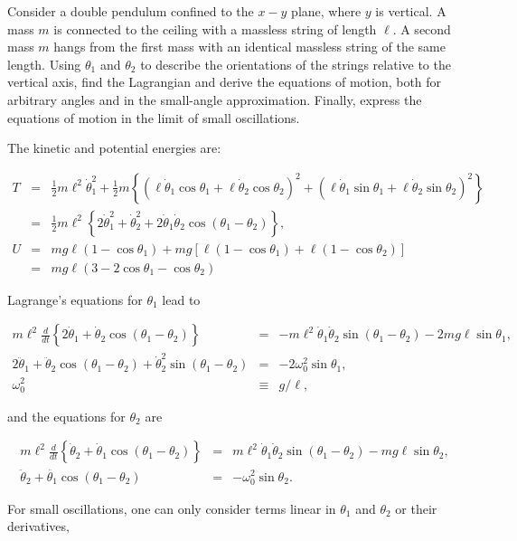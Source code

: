 \documentclass[%
oneside,                 %
final,                   %
10pt]{article}
\begin{document}
Consider a double pendulum confined to the $x-y$ plane, where $y$ is
vertical. A mass $m$ is connected to the ceiling with a massless
string of length $\ell$. A second mass $m$ hangs from the first mass
with an identical massless string of the same length. Using $\theta_1$
and $\theta_2$ to describe the orientations of the strings relative to
the vertical axis, find the Lagrangian and derive the equations of
motion, both for arbitrary angles and in the small-angle
approximation. Finally, express the equations of motion in the limit
of small oscillations.

The kinetic and potential energies are:

\begin{eqnarray*}
T&=&\frac{1}{2}m\ell^2\dot{\theta}_1^2
+\frac{1}{2}m\left\{(\ell\dot{\theta}_1\cos\theta_1+\ell\dot{\theta}_2\cos\theta_2)^2
+(\ell\dot{\theta}_1\sin\theta_1+\ell\dot{\theta}_2\sin\theta_2)^2\right\}\\
&=&\frac{1}{2}m\ell^2\left\{2\dot{\theta}_1^2+\dot{\theta}_2^2+2\dot{\theta}_1\dot{\theta}_2\cos(\theta_1-\theta_2)
\right\},\\
U&=&mg\ell(1-\cos\theta_1)+mg\left[\ell(1-\cos\theta_1)+\ell(1-\cos\theta_2)\right]\\
&=&mg\ell(3-2\cos\theta_1-\cos\theta_2)
\end{eqnarray*}

Lagrange's equations for $\theta_1$ lead to

\begin{eqnarray*}
m\ell^2\frac{d}{dt}\left\{2\dot{\theta}_1+\dot{\theta}_2\cos(\theta_1-\theta_2)\right\}&=&
-m\ell^2\dot{\theta}_1\dot{\theta}_2\sin(\theta_1-\theta_2)
-2mg\ell\sin\theta_1,\\
2\ddot{\theta}_1+\ddot{\theta}_2\cos(\theta_1-\theta_2)+\dot{\theta}_2^2\sin(\theta_1-\theta_2)
&=&-2\omega_0^2\sin\theta_1,\\
\omega_0^2&\equiv& g/\ell,
\end{eqnarray*}

and the equations for $\theta_2$ are

\begin{eqnarray*}
m\ell^2\frac{d}{dt}\left\{\dot{\theta}_2+\dot{\theta}_1\cos(\theta_1-\theta_2)\right\}&=&
m\ell^2\dot{\theta}_1\dot{\theta}_2\sin(\theta_1-\theta_2)-mg\ell\sin\theta_2,\\
\ddot{\theta}_2+\ddot{\theta_1}\cos(\theta_1-\theta_2)&=&
-\omega_0^2\sin\theta_2.
\end{eqnarray*}

For small oscillations, one can only consider terms linear in $\theta_1$ and $\theta_2$ or their derivatives,
\end{document}
